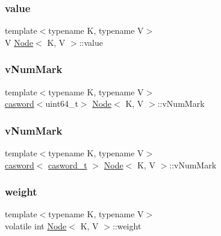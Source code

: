 \subsubsection{\texorpdfstring{value}{value}\hspace{0.1cm}{\footnotesize\ttfamily [2/2]}}
{\footnotesize\ttfamily template$<$typename K, typename V$>$ \\
V \hyperlink{classNode}{Node}$<$ K, V $>$\+::value}

\mbox{\label{classNode_a3f9e4ea9fc73761a06375bb5f3ebcd60}} 
\subsubsection{\texorpdfstring{v\+Num\+Mark}{vNumMark}\hspace{0.1cm}{\footnotesize\ttfamily [1/2]}}
{\footnotesize\ttfamily template$<$typename K, typename V$>$ \\
\hyperlink{structcasword}{casword}$<$uint64\+\_\+t$>$ \hyperlink{classNode}{Node}$<$ K, V $>$\+::v\+Num\+Mark}

\mbox{\label{classNode_a0aaf5a1dde5a35ada56cbd256639d894}} 
\subsubsection{\texorpdfstring{v\+Num\+Mark}{vNumMark}\hspace{0.1cm}{\footnotesize\ttfamily [2/2]}}
{\footnotesize\ttfamily template$<$typename K, typename V$>$ \\
\hyperlink{structcasword}{casword}$<$ \hyperlink{rq__unsafe_8h_ad45142aaf2ff20a036dc6242b8483e9c}{casword\+\_\+t} $>$ \hyperlink{classNode}{Node}$<$ K, V $>$\+::v\+Num\+Mark}

\mbox{\label{classNode_a1c307fd773eae7760993981655620539}} 
\subsubsection{\texorpdfstring{weight}{weight}}
{\footnotesize\ttfamily template$<$typename K, typename V$>$ \\
volatile int \hyperlink{classNode}{Node}$<$ K, V $>$\+::weight}




